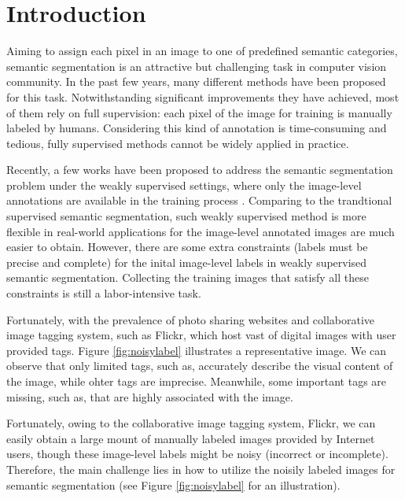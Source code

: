 \section{Introduction}
Aiming to assign each pixel in an image to one of predefined semantic categories, semantic segmentation is an attractive but challenging task in computer vision community. In the past few years, many different methods \cite{csurka2011efficient,gonfaus2010harmony,ladicky2009associative,nowozin2010parameter,shotton2008semantic,shotton2006textonboost,singh2013nonparametric,verbeek2007scene,yang2007multiple,yao2012describing} have been proposed for this task. Notwithstanding significant improvements they have achieved, most of them rely on full supervision: each pixel of the image for training is manually labeled by humans. Considering this kind of annotation is time-consuming and tedious, fully supervised methods cannot be widely applied in practice.

Recently, a few works have been proposed to address the semantic segmentation problem under the weakly supervised settings, where only the image-level annotations are available in the training process \cite{verbeek2007region,vezhnevets2010towards,vezhnevets2011weakly,vezhnevets2012weakly,xu2014tell,zhang2013sparse}. Comparing to the trandtional supervised semantic segmentation, such weakly supervised method is more flexible in real-world applications for the image-level annotated images are much easier to obtain. However, there are some extra constraints (\eg labels must be precise and complete) for the inital image-level labels in weakly supervised semantic segmentation. Collecting the training images that satisfy all these constraints is still a labor-intensive task.

Fortunately, with the prevalence of photo sharing websites and collaborative image tagging system, such as Flickr, which host vast of digital images with user provided tags. Figure \ref{fig:noisylabel} illustrates a representative image. We can observe that only limited tags, such as, accurately describe the visual content of the image, while ohter tags are imprecise. Meanwhile, some important tags are missing, such as, that are highly associated with the image.

\if
Fortunately, owing to the collaborative image tagging system, \eg Flickr, we can easily obtain a large mount of manually labeled images provided by Internet users, though these image-level labels might be noisy (incorrect or incomplete). Therefore, the main challenge lies in how to utilize the noisily labeled images for semantic segmentation (see Figure \ref{fig:noisylabel} for an illustration).


